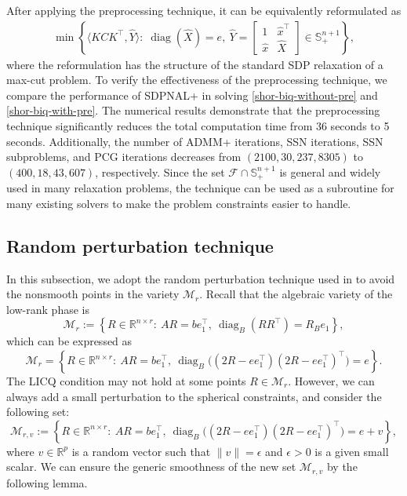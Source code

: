 \documentclass[11pt]{article}
\theoremstyle{plain}
\def\<{\big\langle}
\def\>{\big\rangle}
\def\M{\mathcal{M}}
\def\F{\mathcal{F}}
\def\R{\mathbb{R}}
\def\S{\mathbb{S}}
\DeclareMathOperator{\diag}{diag}
\begin{document}
After applying the preprocessing technique, it can be equivalently reformulated as
\begin{equation}\label{shor-biq-with-pre}
\begin{aligned}
    \min \left\{ \<KCK^\top, \widehat{Y}\> :  \; \diag(\widehat{X})=e,\   \widehat{Y}=\begin{bmatrix}
    1&\widehat{x}^\top\\\widehat{x}&\widehat{X} \end{bmatrix}\in\S^{n+1}_+ \right\},
\end{aligned}
\end{equation}
where the reformulation has the structure of the standard SDP relaxation 
of a max-cut problem. To verify the effectiveness of the preprocessing technique, we compare the performance of SDPNAL+ in solving \eqref{shor-biq-without-pre} and \eqref{shor-biq-with-pre}. The numerical results demonstrate that the preprocessing technique significantly reduces the total computation time from 36 seconds to 5 seconds. Additionally, the number of ADMM+ iterations, SSN iterations, SSN subproblems, and PCG iterations decreases from $(2100,30,237,8305)$ to $(400,18,43,607)$, respectively. Since the set $\F\cap\S^{n+1}_+$ is general and widely used in many relaxation problems, the technique can be used as a subroutine for many existing solvers to make the problem constraints easier to handle.


\subsection{Random perturbation technique}\label{subsec-perturnation}

In this subsection, we adopt the random perturbation technique used in \cite{tang2023feasible} to avoid the nonsmooth points in the variety $\M_r$. Recall that the algebraic variety of the low-rank phase is
\begin{equation*}
\mathcal{M}_r := \left\{R \in \mathbb{R}^{n \times r} :\  AR=be_1^\top,\ \operatorname{diag}_B(RR^{\top})=R_B e_1 \right\},
\end{equation*}
which can be expressed as
\begin{equation*}
\mathcal{M}_r = \left\{R \in \mathbb{R}^{n \times r} :\  AR=be_1^\top,\ \operatorname{diag}_B\big((2R-ee_1^\top)(2R-ee_1^\top)^{\top}\big)=e \right\}.
\end{equation*}
The LICQ condition may not hold at some points $R\in\M_r$. However, we can always add a small perturbation to the spherical constraints, and consider the following set:
\begin{equation*}
\mathcal{M}_{r,v} := \left\{R \in \mathbb{R}^{n \times r} :\  AR=be_1^\top,\ \operatorname{diag}_B\big((2R-ee_1^\top)(2R-ee_1^\top)^{\top}\big)=e+v \right\},
\end{equation*}
where $v\in\R^p$ is a random vector such that $\|v\|=\epsilon$ and $\epsilon>0$ is a given small scalar. We can ensure the generic smoothness of the new set $\M_{r,v}$ by the following lemma.
\end{document}
